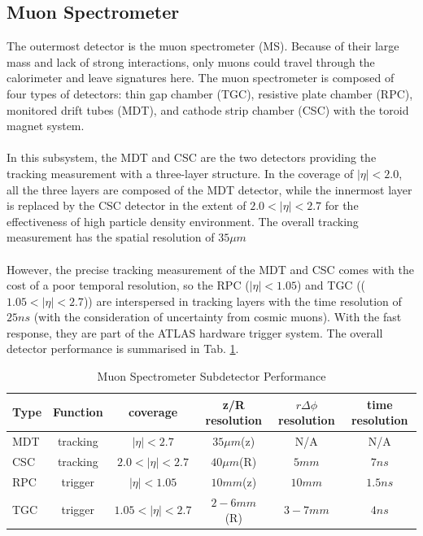 \subsection{Muon Spectrometer\cite{MS_all}}
The outermost detector is the muon spectrometer (MS). Because of their large mass and lack of strong interactions, only muons could travel through the calorimeter and leave signatures here. The muon spectrometer is composed of four types of detectors: thin gap chamber (TGC), resistive plate chamber (RPC), monitored drift tubes (MDT), and cathode strip chamber (CSC) with the toroid magnet system.  
\\
\\In this subsystem, the MDT and CSC are the two detectors providing the tracking measurement with a three-layer structure. In the coverage of $|\eta|<2.0$, all the three layers are composed of the MDT detector, while the innermost layer is replaced by the CSC detector in the extent of $2.0<|\eta|<2.7$ for the effectiveness of high particle density environment. The overall tracking measurement has the spatial resolution of $35 \mu m$
\\
\\However, the precise tracking measurement of the MDT and CSC comes with the cost of a poor temporal resolution, so the RPC ($|\eta|<1.05$) and TGC (($1.05<|\eta|<2.7$)) are interspersed in tracking layers with the time resolution of $25ns$ (with the consideration of uncertainty from cosmic muons). With the fast response, they are part of the ATLAS hardware trigger system. The overall detector performance is summarised in Tab. \ref{Tab:ms}.

\begin{table}[h]
	\caption{Muon Spectrometer Subdetector Performance}
	\renewcommand{\arraystretch}{1.3}
	\centering
	\begin{tabular}{l | c | c | c | c | c }
		\hline
		\hline
		{\bf Type}     &{\bf Function} &{\bf coverage}    &{\bf z/R resolution}  &{\bf $r \Delta \phi$ resolution}&{\bf time resolution}\\
		\hline
		MDT            &tracking       &$|\eta|<2.7$      &$35\mu m$(z)          &N/A                             &N/A            \\
		\hline
		CSC            &tracking       &$2.0<|\eta|<2.7$  &$40\mu m$(R)          &$5mm$                           &$7ns$          \\
		\hline
		RPC            &trigger        &$|\eta|<1.05$     &$10mm$(z)             &$10mm$                          &$1.5ns$         \\
		\hline
		TGC            &trigger        &$1.05<|\eta|<2.7$ &$2-6mm$(R)            &$3-7mm$                         &$4ns$           \\
		\hline
	\end{tabular}
	\label{Tab:ms}
\end{table}

